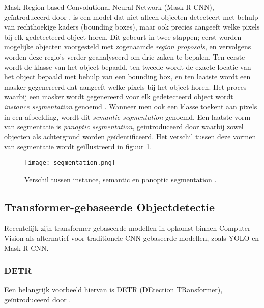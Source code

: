 Mask Region-based Convolutional Neural Network (Mask R-CNN), geïntroduceerd door \textcite{He2018}, is een model dat niet alleen objecten detecteert met behulp van rechthoekige kaders (bounding boxes), 
maar ook precies aangeeft welke pixels bij elk gedetecteerd object horen. Dit gebeurt in twee stappen; eerst worden mogelijke objecten voorgesteld met zogenaamde \textit{region proposals}, en vervolgens
worden deze regio's verder geanalyseerd om drie zaken te bepalen. Ten eerste wordt de klasse van het object bepaald, ten tweede wordt de exacte locatie van het object bepaald met behulp van een bounding box, en ten laatste
wordt een masker gegenereerd dat aangeeft welke pixels bij het object horen. Het proces waarbij een masker wordt gegenereerd voor elk gedetecteerd object wordt \textit{instance segmentation} genoemd \autocite{Hafiz2020}.
Wanneer men ook een klasse toekent aan pixels in een afbeelding, wordt dit \textit{semantic segmentation} genoemd. Een laatste vorm van segmentatie is \textit{panoptic segmentation}, geintroduceerd door \textcite{Kirillov2019} waarbij zowel objecten als achtergrond worden geïdentificeerd.
Het verschil tussen deze vormen van segmentatie wordt geïllustreerd in figuur \ref{fig:segmentation}.

\begin{figure}[H]
  \centering
  \texttt{[image: segmentation.png]}
  \caption[]{\label{fig:segmentation}
  Verschil tussen instance, semantic en panoptic segmentation \autocite{Kirillov2019}.
  }
\end{figure}

\subsection{Transformer-gebaseerde Objectdetectie}

Recentelijk zijn transformer-gebaseerde modellen in opkomst binnen Computer Vision als alternatief voor traditionele CNN-gebaseerde modellen, zoals YOLO en Mask R-CNN. 

\subsubsection{DETR}

Een belangrijk voorbeeld hiervan is DETR (DEtection TRansformer), geïntroduceerd door \textcite{Carion2020}.

